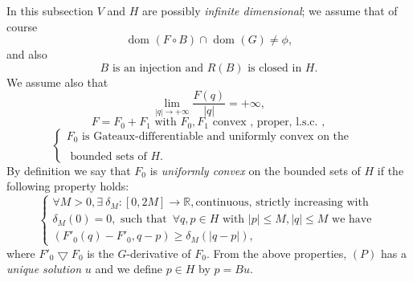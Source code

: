  In this subsection $V$ and $H$ are possibly \textit{infinite dimensional}; we assume that of course
 \begin{equation}
\text{ dom } (F \circ B) \cap \text{ dom } (G) \neq \phi, \tag{4.1}\label{c5:eq4.1}
 \end{equation} 
 and also 
 \begin{equation}
B \text{ is an injection and } R (B) \text{ is closed in }H.\tag{4.2}\label{c5:eq4.2}
\end{equation} 
We assume also that 
\begin{equation}
\lim\limits_{|q| \to + \infty} \frac{F (q)} {|q|} = + \infty, \tag{4.3}\label{c5:eq4.3}
\end{equation}  
\begin{equation}
F = F_0 + F_1 \text{ with } F_0, F_1 \text{ convex , proper, l.s.c. }, 
\end{equation} 
\begin{equation}
\begin{cases}
F_0 \text{ is Gateaux-differentiable and uniformly convex on the }\\
& \\
\text{ bounded sets of }H.\tag{4.5}\label{c5:eq4.5}
\end{cases}
\end{equation}
By definition we say that $F_0$ is \textit{uniformly convex} on the
bounded sets of $H$ if the following property holds: 
\begin{equation}
\begin{cases}
\forall M > 0, \exists ~\delta_M : [0, 2M] \to \mathbb{R},
\text{continuous, strictly increasing with }\\ 
\delta_M (0) = 0,  \text{ such that }\, \forall q, p \in H \text{ with } |p|  \leq M, |q| \leq M \text{ we have }\\
(F'_0 (q) - F'_0, q-p) \geq \delta_M (|q-p|), \tag{4.6}\label{c5:eq4.6}
\end{cases}
\end{equation} 
where $F'_0 \bigtriangledown F_0$ is the $G$-derivative of $F_0$. From the above properties, $(P)$ has a \textit{unique solution} $u$ and we define $p \in H$ by $p = Bu$.
 

